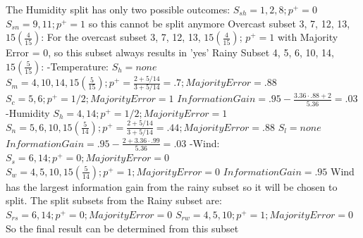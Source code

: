 \documentclass[12pt, fullpage,letterpaper]{article}
\begin{document}
\begin{enumerate}
\begin{enumerate}
	\newline
	\newline The Humidity split has only two possible outcomes: 
	\newline $S_{sh}=1, 2, 8; p^+ =0$
	\newline $S_{sn}=9, 11; p^+ =1$
	\newline so this cannot be split anymore
	\newline
	\newline Overcast subset 3, 7, 12, 13, $15(\frac{4}{15})$:
	\newline For the overcast subset 3, 7, 12, 13, $15(\frac{4}{15})$; $p^+=1$ with Majority Error = 0, so this subset always results in 'yes'
	\newline
	\newline Rainy Subset 4, 5, 6, 10, 14, $15(\frac{5}{15})$:
	\newline -Temperature:
	\newline $S_h = none$
	\newline $S_m=4, 10, 14, 15(\frac{5}{15}); p^+=\frac{2+5/14}{3+5/14}=.7; Majority Error=.88$
	\newline $S_c=5, 6; p^+=1/2; Majority Error=1$
	\newline $Information Gain=.95-\frac{3.36\cdot.88+2}{5.36}=.03$
	\newline -Humidity
	\newline $S_h = 4, 14; p^+=1/2; Majority Error=1$
	\newline $S_n=5, 6, 10, 15(\frac{5}{14}); p^+=\frac{2+5/14}{3+5/14}=.44; Majority Error=.88$
	\newline $S_l=none$
	\newline $Information Gain=.95-\frac{2+3.36\cdot.99}{5.36}=.03$
	\newline -Wind:
	\newline $S_s = 6, 14; p^+=0; Majority Error=0$
	\newline $S_w=4, 5, 10, 15(\frac{5}{14}); p^+=1; Majority Error=0$
	\newline $Information Gain=.95$
	\newline Wind has the largest information gain from the rainy subset so it will be chosen to split. 
	\newline
	\newline The split subsets from the Rainy subset are:
	\newline $S_{rs}=6, 14; p^+=0; Majority Error = 0$
	\newline $S_{rw}=4, 5, 10; p^+=1; Majority Error = 0$
	\newline So the final result can be determined from this subset

\end{enumerate}
\end{enumerate}
\end{document}
